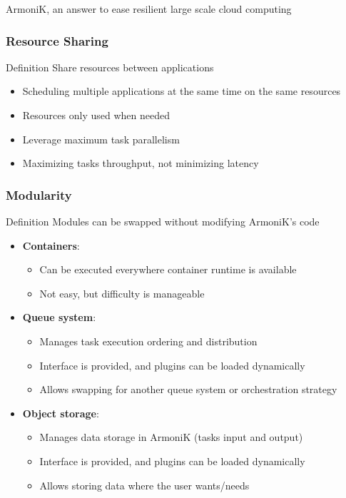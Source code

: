 \documentclass[10pt,aspectratio=1609]{beamer}
\begin{document}
\begin{section}{ArmoniK, an answer to ease resilient large scale cloud computing}
  \begin{frame}
    \frametitle{Resource Sharing}
    \begin{block}{Definition}
      Share resources between applications
    \end{block}
    \begin{itemize}
      \item Scheduling multiple applications at the same time on the same resources
      \item Resources only used when needed
      \item Leverage maximum task parallelism
      \item Maximizing tasks throughput, not minimizing latency
    \end{itemize}
  \end{frame}

  \begin{frame}
    \frametitle{Modularity}
    \begin{block}{Definition}
      Modules can be swapped without modifying ArmoniK's code
    \end{block}
    \begin{itemize}
      \item \textbf{Containers}:
      \begin{itemize}
        \item Can be executed everywhere container runtime is available
        \item Not easy, but difficulty is manageable
      \end{itemize}
      \item \textbf{Queue system}:
      \begin{itemize}
        \item Manages task execution ordering and distribution
        \item Interface is provided, and plugins can be loaded dynamically
        \item Allows swapping for another queue system or orchestration strategy
      \end{itemize}
      \item \textbf{Object storage}:
      \begin{itemize}
        \item Manages data storage in ArmoniK (tasks input and output)
        \item Interface is provided, and plugins can be loaded dynamically
        \item Allows storing data where the user wants/needs
      \end{itemize}
    \end{itemize}
  \end{frame}


\end{section}
\end{document}
